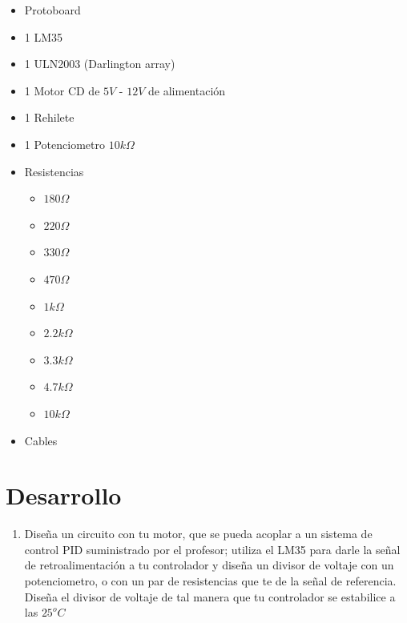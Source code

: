	\begin{itemize}
		\item Protoboard
		\item 1 LM35
		\item 1 ULN2003 (Darlington array)
		\item 1 Motor CD de $5 V$ - $12 V$ de alimentación
		\item 1 Rehilete
		\item 1 Potenciometro $10 k\Omega$
		\item Resistencias
		\begin{itemize}
			\item $180 \Omega$
			\item $220 \Omega$
			\item $330 \Omega$
			\item $470 \Omega$
			\item $1 k\Omega$
			\item $2.2 k\Omega$
			\item $3.3 k\Omega$
			\item $4.7 k\Omega$
			\item $10 k\Omega$
		\end{itemize}
		\item Cables
	\end{itemize}


\section{Desarrollo}

	\begin{enumerate}
		\item Diseña un circuito con tu motor, que se pueda acoplar a un sistema de control PID suministrado por el profesor; utiliza el LM35 para darle la señal de retroalimentación a tu controlador y diseña un divisor de voltaje con un potenciometro, o con un par de resistencias que te de la señal de referencia. Diseña el divisor de voltaje de tal manera que tu controlador se estabilice a las $25^o C$
	\end{enumerate}



